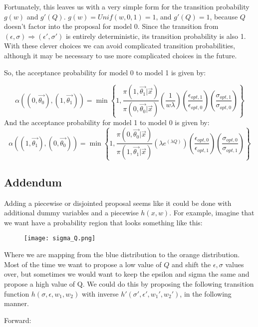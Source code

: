 \documentclass[letterpaper,12pt]{article}
\begin{document}
Fortunately, this leaves us with a very simple form for the transition probability $g(w)$ and $g'(Q)$.  $g(w) = Unif (w,0,1) = 1$, and $g'(Q) = 1$, because $Q$ doesn't factor into the proposal for model 0. Since the transition from $(\epsilon,\sigma) \Rightarrow (\epsilon',\sigma')$ is entirely deterministic, its transition probability is also 1.  With these clever choices we can avoid complicated transition probabilities, although it may be necessary to use more complicated choices in the future.

So, the acceptance probability for model 0 to model 1 is given by: 

\begin{equation}
\alpha((0,\vec{\theta_0}),(1,\vec{\theta_{1}})) = \min \left \{ 1, \frac{\pi(1,\vec{\theta_1} | \vec{x} )}{\pi(0,\vec{\theta_0} | \vec{x} )}  \left (\frac{1}{w \lambda} \right ) \left (\frac{\epsilon_{opt,1}}{\epsilon_{opt,0}} \right ) \left ( \frac{\sigma_{opt,1}}{\sigma_{opt,0}} \right )  \right \} 
\end{equation}
And the acceptance probability for model 1 to model 0 is given by:
\begin{equation}
\alpha((1,\vec{\theta_1}),(0,\vec{\theta_{0}})) = \min \left \{ 1, \frac{\pi(0,\vec{\theta_0} | \vec{x} )}{\pi(1,\vec{\theta_1} | \vec{x} )}    \left (\lambda e^{(\lambda Q)} \right ) \left (\frac{\epsilon_{opt,0}}{\epsilon_{opt,1}} \right ) \left ( \frac{\sigma_{opt,0}}{\sigma_{opt,1}} \right ) \right \}
\end{equation}

\subsection{Addendum}

Adding a piecewise or disjointed proposal seems like it could be done with additional dummy variables and a piecewise $h(x,w)$.
For example, imagine that we want have a probability region that looks something like this:

\begin{figure}[h]
\centering
\texttt{[image: sigma\_Q.png]}
\end{figure}

Where we are mapping from the blue distribution to the orange distribution.  Most of the time we want to propose a low value of $Q$ and shift the $\epsilon,\sigma$ values over, but sometimes we would want to keep the epsilon and sigma the same and propose a high value of Q.  We could do this by proposing the following transition function $h(\sigma,\epsilon,w_1,w_2)$ with inverse $h'(\sigma',\epsilon',w_1',w_2')$, in the following manner.

Forward:

\begin{align*}



\end{align*}
\end{document}
